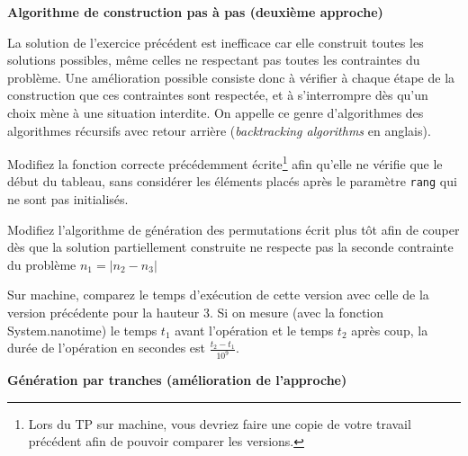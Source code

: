 \documentclass[10pt]{article}\usepackage[correction,nu]{esial}
\begin{document}
\begin{Exercice}\textbf{Algorithme de construction pas à pas (deuxième approche)}

  \noindent La solution de l'exercice précédent est inefficace car elle
  construit toutes les solutions possibles, même celles ne respectant pas toutes
  les contraintes du problème. Une amélioration possible consiste donc à
  vérifier à chaque étape de la construction que ces contraintes sont respectée,
  et à s'interrompre dès qu'un choix mène à une situation interdite.
  On appelle ce genre d'algorithmes des algorithmes récursifs avec retour
  arrière (\textit{backtracking algorithms} en anglais).

  \begin{Question}
    Modifiez la fonction correcte précédemment écrite\footnote{Lors du TP sur
      machine, vous devriez faire une copie de votre travail précédent afin de
      pouvoir comparer les versions.} afin qu'elle ne vérifie
    que le début du tableau, sans considérer les éléments placés après le
    paramètre \texttt{rang} qui ne sont pas initialisés.
  \end{Question}

  \begin{Reponse}
    \newcommand*\FancyVerbStartString{// BEGIN CORRECTE}
    \newcommand*\FancyVerbStopString{// END CORRECTE}
  \end{Reponse}

  \Question %
  Modifiez l'algorithme de génération des permutations écrit plus tôt afin de
  couper dès que la solution partiellement construite ne respecte pas la seconde
  contrainte du problème $n_1=\left|n_2-n_3\right|$

  \begin{Reponse}
    \newcommand*\FancyVerbStartString{// BEGIN GENERE}
    \newcommand*\FancyVerbStopString{// END GENERE}
  \end{Reponse}

  \Question %
  Sur machine, comparez le temps d'exécution de cette version avec celle de la
  version précédente pour la hauteur 3.  Si on mesure (avec la fonction
  System.nanotime) le temps $t_1$ avant l'opération et le temps $t_2$ après
  coup, la durée de l'opération en secondes est $\frac{t_2-t_1}{10^9}$.
\end{Exercice}

\ifcorrection{\newpage}{}
\begin{Exercice}\textbf{Génération par tranches (amélioration de l'approche)}
\end{Exercice}
\end{document}
